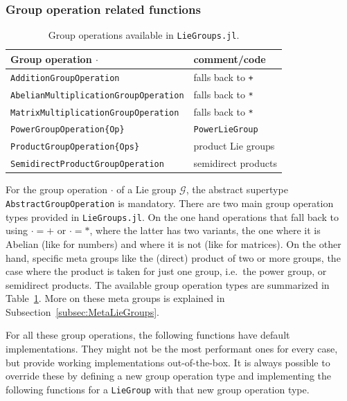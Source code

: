 \documentclass{juliacon}
\begin{document}
\subsubsection*{Group operation related functions}

\begin{table}
    \centering
    \caption{Group operations available in \texttt{LieGroups.jl}.}
    \begin{tabular}{@{}ll@{}}
        \toprule
        \textbf{Group operation} $\cdot$ & comment/code\\
        \midrule
        \verb|AdditionGroupOperation| & falls back to \verb|+|\\
        \verb|AbelianMultiplicationGroupOperation| & falls back to \verb|*|\\
        \verb|MatrixMultiplicationGroupOperation| & falls back to \verb|*|\\
        \verb|PowerGroupOperation{Op}| & \verb|PowerLieGroup|\\
        \verb|ProductGroupOperation{Ops}| & product Lie groups\\
        \verb|SemidirectProductGroupOperation| & semidirect products\\
        \bottomrule
    \end{tabular}
    \label{tab:GroupOperations}
\end{table}

For the group operation \(\cdot\) of a Lie group \(\mathcal{G}\), the abstract supertype \verb|AbstractGroupOperation| is mandatory. There are two main group operation types provided in \verb|LieGroups.jl|. On the one hand operations that fall back to using $\cdot = +$ or $\cdot = *$, where the latter has two variants, the one where it is Abelian (like for numbers) and where it is not (like for matrices).
On the other hand, specific meta groups like the (direct) product of two or more groups, the case where the product is taken for just one group, i.e.\ the power group, or semidirect products. The available group operation types are summarized in Table~\ref{tab:GroupOperations}. More on these meta groups is explained in Subsection~\ref{subsec:MetaLieGroups}.

For all these group operations, the following functions have default implementations. They might not be the most performant ones for every case, but provide working implementations out-of-the-box.
It is always possible to override these by defining a new group operation type and implementing the following functions for a \verb|LieGroup| with that new group operation type.
\end{document}
